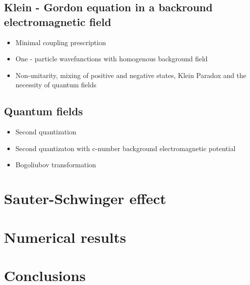\documentclass[11pt]{article}
\numberwithin{equation}{section}
\begin{document}
    \subsection{Klein - Gordon equation in a backround electromagnetic field}
    \begin{itemize}
      \item       Minimal coupling prescription
      \item       One - particle wavefunctions with homogenous background field
      \item       Non-unitarity, mixing of positive and negative states, Klein Paradox and the necessity of quantum fields
    \end{itemize}
    \subsection{Quantum fields}
    \begin{itemize}
      \item       Second quantization
      \item       Second quantizaton with c-number background electromagnetic potential
      \item       Bogoliubov transformation
    \end{itemize}
  \section{Sauter-Schwinger effect}
  \section{Numerical results}
  \section{Conclusions}
\end{document}
